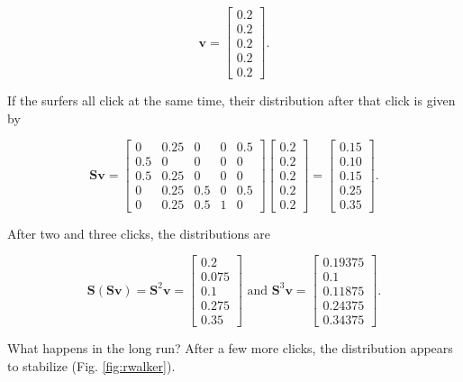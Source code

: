 \documentclass[
]{book}
\theoremstyle{definition}
\theoremstyle{definition}
\theoremstyle{definition}
\theoremstyle{definition}
\theoremstyle{remark}
\begin{document}
\[\mathbf{v}=\begin{bmatrix}0.2\\0.2\\0.2\\0.2\\0.2\end{bmatrix}.\]

If the surfers all click at the same time, their distribution after that click is given by

\[\mathbf{S}\mathbf{v}=\begin{bmatrix}0 & 0.25 & 0 & 0 & 0.5\\
0.5 & 0 & 0 & 0 & 0\\
0.5 & 0.25 & 0 & 0 & 0\\
0 & 0.25 & 0.5 & 0 & 0.5\\
0 & 0.25 & 0.5 & 1 & 0\end{bmatrix}\begin{bmatrix}0.2\\0.2\\0.2\\0.2\\0.2\end{bmatrix}=\begin{bmatrix} 0.15 \\ 0.10 \\ 0.15 \\ 0.25 \\ 0.35\end{bmatrix}.\]

After two and three clicks, the distributions are

\[\mathbf{S}(\mathbf{S}\mathbf{v})=\mathbf{S}^2\mathbf{v}=\begin{bmatrix}0.2\\0.075\\0.1\\0.275\\0.35\end{bmatrix} \text{ and } \mathbf{S}^3\mathbf{v}=\begin{bmatrix}0.19375\\0.1\\0.11875\\0.24375\\0.34375\end{bmatrix}.\]

What happens in the long run? After a few more clicks, the distribution appears to stabilize (Fig. \ref{fig:rwalker}).
\end{document}
